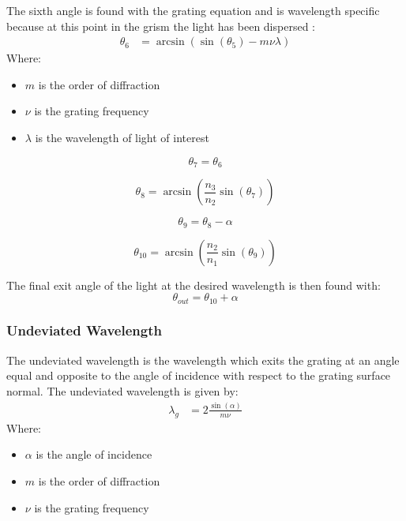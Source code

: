 \documentclass{article}
\begin{document}
The sixth angle is found with the grating equation and is wavelength specific because at this point in the grism the light has been dispersed \cite{Barden1999-vq, Barden2000-sv}: 
\begin{align} 
\theta_6 &= \arcsin\left( \sin\left( \theta_5 \right) - m\nu\lambda \right)
\end{align}
Where:
\begin{itemize}[label={}]
    \item $m$ is the order of diffraction
    \item $\nu$ is the grating frequency
    \item $\lambda$ is the wavelength of light of interest
\end{itemize}

\begin{equation}
\theta_7 = \theta_6
\end{equation}

\begin{equation}
\theta_8 = \arcsin\left( \frac{n_3}{n_2} \sin\left( \theta_7 \right) \right) 
\end{equation}

\begin{equation}
\theta_9 = \theta_8 - \alpha
\end{equation}

\begin{equation}
\theta_{10} = \arcsin\left( \frac{n_2}{n_1} \sin\left( \theta_9 \right) \right)
\end{equation}

The final exit angle of the light at the desired wavelength is then found with:
\begin{equation}
\boxed{\theta_{out} = \theta_{10} + \alpha}
\end{equation}

\subsubsection{Undeviated Wavelength}
The undeviated wavelength is the wavelength which exits the grating at an angle equal and opposite to the angle of incidence with respect to the grating surface normal. The undeviated wavelength is given by:
\begin{align}
\lambda_g &= 2 \frac{\sin\left( \alpha \right)}{m\nu}
\end{align}
Where:
\begin{itemize}[label={}]
    \item $\alpha$ is the angle of incidence
    \item $m$ is the order of diffraction
    \item $\nu$ is the grating frequency
\end{itemize}
\end{document}
